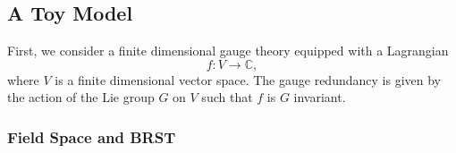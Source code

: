 \documentclass[10pt]{article}
\begin{document}
\subsection{A Toy Model}

First, we consider a finite dimensional gauge theory equipped with a Lagrangian
\begin{equation*}
  f: V \rightarrow \mathbb{C},
\end{equation*}
where $ V $ is a finite dimensional vector space. The gauge redundancy is given by the action of the Lie group $ G$ on $ V$ such that $ f$ is $ G$ invariant.

\subsubsection{Field Space and BRST}
\end{document}
